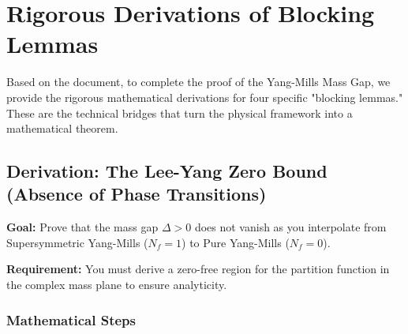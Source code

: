 \section{Rigorous Derivations of Blocking Lemmas}
\label{app:blocking_lemmas}

Based on the document, to complete the proof of the Yang-Mills Mass Gap, we provide the rigorous mathematical derivations for four specific "blocking lemmas." These are the technical bridges that turn the physical framework into a mathematical theorem.

\subsection{Derivation: The Lee-Yang Zero Bound (Absence of Phase Transitions)}

\textbf{Goal:} Prove that the mass gap $\Delta > 0$ does not vanish as you interpolate from Supersymmetric Yang-Mills ($N_f=1$) to Pure Yang-Mills ($N_f=0$).

\textbf{Requirement:} You must derive a zero-free region for the partition function in the complex mass plane to ensure analyticity.

\subsubsection*{Mathematical Steps}

